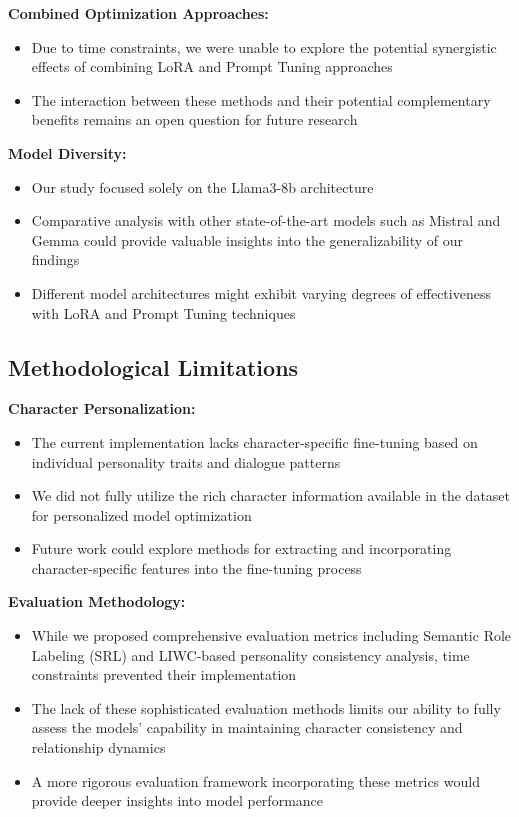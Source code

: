 \documentclass{article}
\begin{document}
\textbf{Combined Optimization Approaches:}
\begin{itemize}
\item Due to time constraints, we were unable to explore the potential synergistic effects of combining LoRA and Prompt Tuning approaches
\item The interaction between these methods and their potential complementary benefits remains an open question for future research
\end{itemize}

\textbf{Model Diversity:}
\begin{itemize}
\item Our study focused solely on the Llama3-8b architecture
\item Comparative analysis with other state-of-the-art models such as Mistral and Gemma could provide valuable insights into the generalizability of our findings
\item Different model architectures might exhibit varying degrees of effectiveness with LoRA and Prompt Tuning techniques
\end{itemize}

\subsection{Methodological Limitations}

\textbf{Character Personalization:}
\begin{itemize}
\item The current implementation lacks character-specific fine-tuning based on individual personality traits and dialogue patterns
\item We did not fully utilize the rich character information available in the dataset for personalized model optimization
\item Future work could explore methods for extracting and incorporating character-specific features into the fine-tuning process
\end{itemize}

\textbf{Evaluation Methodology:}
\begin{itemize}
\item While we proposed comprehensive evaluation metrics including Semantic Role Labeling (SRL) and LIWC-based personality consistency analysis, time constraints prevented their implementation
\item The lack of these sophisticated evaluation methods limits our ability to fully assess the models' capability in maintaining character consistency and relationship dynamics
\item A more rigorous evaluation framework incorporating these metrics would provide deeper insights into model performance
\end{itemize}
\end{document}

